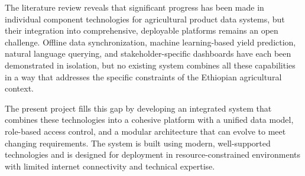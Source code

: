 The literature review reveals that significant progress has been made in individual component technologies for agricultural product data systems, but their integration into comprehensive, deployable platforms remains an open challenge. Offline data synchronization, machine learning-based yield prediction, natural language querying, and stakeholder-specific dashboards have each been demonstrated in isolation, but no existing system combines all these capabilities in a way that addresses the specific constraints of the Ethiopian agricultural context.

The present project fills this gap by developing an integrated system that combines these technologies into a cohesive platform with a unified data model, role-based access control, and a modular architecture that can evolve to meet changing requirements. The system is built using modern, well-supported technologies and is designed for deployment in resource-constrained environments with limited internet connectivity and technical expertise.
